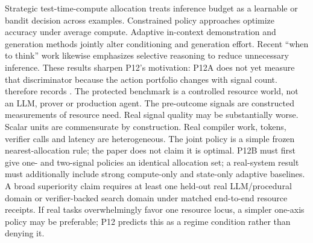 \markdownRendererDocumentBegin
\markdownRendererSectionBegin
{}\markdownRendererInterblockSeparator
{}Strategic test-time-compute allocation treats inference budget as a learnable or bandit decision across examples. Constrained policy approaches optimize accuracy under average compute. Adaptive in-context demonstration and generation methods jointly alter conditioning and generation effort. Recent “when to think” work likewise emphasizes selective reasoning to reduce unnecessary inference.\markdownRendererInterblockSeparator
{}These results sharpen P12's motivation:  P12A does not yet measure that discriminator because the action portfolio changes with signal count.  therefore records .\markdownRendererInterblockSeparator
{}\markdownRendererSectionBegin
{}\markdownRendererInterblockSeparator
{}\markdownRendererOlBeginTight
{}The protected benchmark is a controlled resource world, not an LLM, prover or production agent.\markdownRendererOlItemEnd 
{}The pre-outcome signals are constructed measurements of resource need. Real signal quality may be substantially worse.\markdownRendererOlItemEnd 
{}Scalar units are commensurate by construction. Real compiler work, tokens, verifier calls and latency are heterogeneous.\markdownRendererOlItemEnd 
{}The joint policy is a simple frozen nearest-allocation rule; the paper does not claim it is optimal.\markdownRendererOlItemEnd 
{}P12B must first give one- and two-signal policies an identical allocation set; a real-system result must additionally include strong compute-only and state-only adaptive baselines.\markdownRendererOlItemEnd 
{}A broad superiority claim requires at least one held-out real LLM/procedural domain or verifier-backed search domain under matched end-to-end resource receipts.\markdownRendererOlItemEnd 
{}If real tasks overwhelmingly favor one resource locus, a simpler one-axis policy may be preferable; P12 predicts this as a regime condition rather than denying it.\markdownRendererOlItemEnd 
\markdownRendererOlEndTight 
\markdownRendererSectionEnd 
\markdownRendererSectionEnd \markdownRendererDocumentEnd
